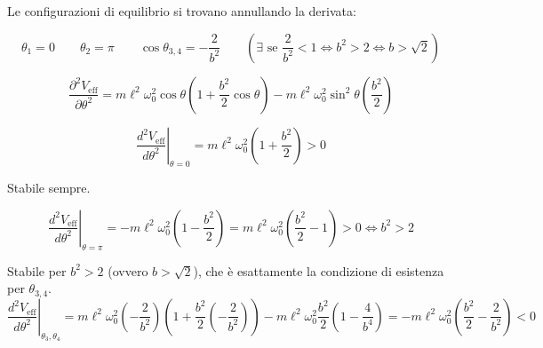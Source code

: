 Le configurazioni di equilibrio si trovano annullando la derivata:

\[
\theta_1=0
\qquad
\theta_2=\pi
\qquad
\cos\theta_{3,4}
=
-\frac{2}{b^2}
\qquad
\left(\exists \text{ se } \frac{2}{b^2}<1 \Longleftrightarrow b^2>2 \Longleftrightarrow b>\sqrt{2}\right)
\]

\begin{center}
\end{center}

\[
\frac{\partial^2 V_{\text{eff}}}{\partial \theta^2}
=
m\ell^2\omega_0^2\cos\theta
\left(
1+\frac{b^2}{2}\cos\theta
\right)
-
m\ell^2\omega_0^2\sin^2\theta
\left(
\frac{b^2}{2}
\right)
\]

\[
\left.
\frac{d^2 V_{\text{eff}}}{d\theta^2}
\right|_{\theta=0}
=
m\ell^2\omega_0^2
\left(
1+\frac{b^2}{2}
\right)
>
0
\]

Stabile sempre.

\[
\left.
\frac{d^2 V_{\text{eff}}}{d\theta^2}
\right|_{\theta=\pi}
=
-m\ell^2\omega_0^2
\left(
1-\frac{b^2}{2}
\right)
=
m\ell^2\omega_0^2
\left(
\frac{b^2}{2}-1
\right)
>
0
\Longleftrightarrow
b^2>2
\]

Stabile per $b^2>2$ (ovvero $b>\sqrt{2}$), che è esattamente la condizione di esistenza per $\theta_{3,4}$.
\[
\left.
\frac{d^2V_{\text{eff}}}{d\theta^2}
\right|_{\theta_3,\theta_4}
=
m\ell^2\omega_0^2
\left(
-\frac{2}{b^2}
\right)
\left(
1+\frac{b^2}{2}
\left(
-\frac{2}{b^2}
\right)
\right)
-
m\ell^2\omega_0^2
\frac{b^2}{2}
\left(
1-\frac{4}{b^4}
\right)
=
-m\ell^2\omega_0^2
\left(
\frac{b^2}{2}
-
\frac{2}{b^2}
\right)
<0
\]


